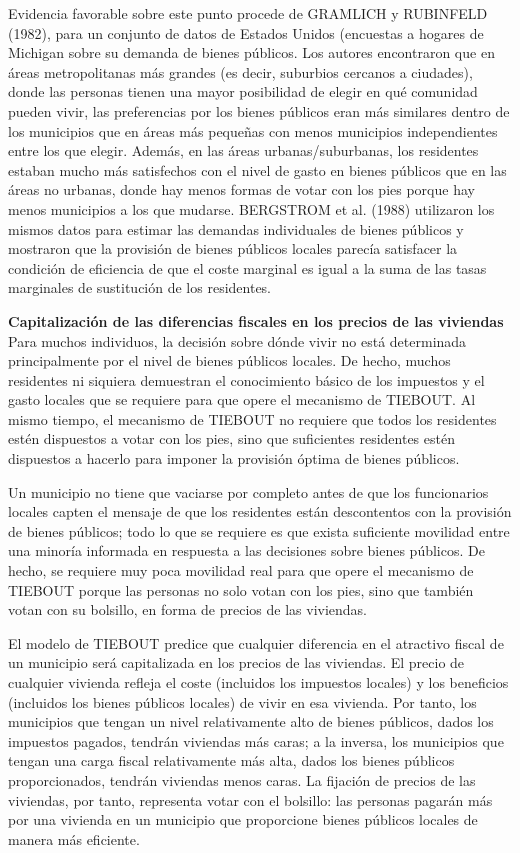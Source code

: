 \documentclass[10pt,a4paper]{article}
\begin{document}
Evidencia favorable sobre este punto procede de GRAMLICH y RUBINFELD (1982), para un conjunto de datos de Estados Unidos (encuestas a hogares de Michigan sobre su demanda de bienes públicos. Los autores encontraron que en áreas metropolitanas más grandes (es decir, suburbios cercanos a ciudades), donde las personas tienen una mayor posibilidad de elegir en qué comunidad pueden vivir, las preferencias por los bienes públicos eran más similares dentro de los municipios que en áreas más pequeñas con menos municipios independientes entre los que elegir. Además, en las áreas urbanas/suburbanas, los residentes estaban mucho más satisfechos con el nivel de gasto en bienes públicos que en las áreas no urbanas, donde hay menos formas de votar con los pies porque hay menos municipios a los que mudarse. BERGSTROM et al. (1988) utilizaron los mismos datos para estimar las demandas individuales de bienes públicos y mostraron que la provisión de bienes públicos locales parecía satisfacer la condición de eficiencia de que el coste marginal es igual a la suma de las tasas marginales de sustitución de los residentes.

\textbf{Capitalización de las diferencias fiscales en los precios de las viviendas }
Para muchos individuos, la decisión sobre dónde vivir no está determinada principalmente por el nivel de bienes públicos locales. De hecho, muchos residentes ni siquiera demuestran el conocimiento básico de los impuestos y el gasto locales que se requiere para que opere el mecanismo de TIEBOUT. Al mismo tiempo, el mecanismo de TIEBOUT no requiere que todos los residentes estén dispuestos a votar con los pies, sino que suficientes residentes estén dispuestos a hacerlo para imponer la provisión óptima de bienes públicos.

Un municipio no tiene que vaciarse por completo antes de que los funcionarios locales capten el mensaje de que los residentes están descontentos con la provisión de bienes públicos; todo lo que se requiere es que exista suficiente movilidad entre una minoría informada en respuesta a las decisiones sobre bienes públicos. De hecho, se requiere muy poca movilidad real para que opere el mecanismo de TIEBOUT porque las personas no solo votan con los pies, sino que también votan con su bolsillo, en forma de precios de las viviendas. 

El modelo de TIEBOUT predice que cualquier diferencia en el atractivo fiscal de un municipio será capitalizada en los precios de las viviendas. El precio de cualquier vivienda refleja el coste (incluidos los impuestos locales) y los beneficios (incluidos los bienes públicos locales) de vivir en esa vivienda. Por tanto, los municipios que tengan un nivel relativamente alto de bienes públicos, dados los impuestos pagados, tendrán viviendas más caras; a la inversa, los municipios que tengan una carga fiscal relativamente más alta, dados los bienes públicos proporcionados, tendrán viviendas menos caras. La fijación de precios de las viviendas, por tanto, representa votar con el bolsillo: las personas pagarán más por una vivienda en un municipio que proporcione bienes públicos locales de manera más eficiente.
\end{document}
